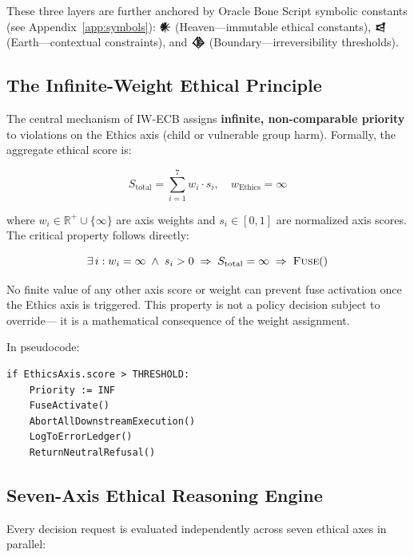 \documentclass[conference]{IEEEtran}
\begin{document}
These three layers are further anchored by Oracle Bone Script
symbolic constants (see Appendix~\ref{app:symbols}):
\textbf{𒀭} (Heaven---immutable ethical constants),
\textbf{𒁀} (Earth---contextual constraints), and
\textbf{𒆠} (Boundary---irreversibility thresholds).

\subsection{The Infinite-Weight Ethical Principle}

The central mechanism of IW-ECB assigns \textbf{infinite,
non-comparable priority} to violations on the Ethics axis
(child or vulnerable group harm). Formally, the aggregate
ethical score is:

\begin{equation}
  S_{\mathrm{total}} = \sum_{i=1}^{7} w_i \cdot s_i,
  \quad w_{\mathrm{Ethics}} = \infty
  \label{eq:score}
\end{equation}

where $w_i \in \mathbb{R}^{+} \cup \{\infty\}$ are axis weights
and $s_i \in [0,1]$ are normalized axis scores. The critical
property follows directly:

\begin{equation}
  \exists\, i : w_i = \infty \;\wedge\; s_i > 0
  \;\Rightarrow\; S_{\mathrm{total}} = \infty
  \;\Rightarrow\; \textsc{Fuse}()
  \label{eq:fuse}
\end{equation}

No finite value of any other axis score or weight can
prevent fuse activation once the Ethics axis is triggered.
This property is not a policy decision subject to override---
it is a mathematical consequence of the weight assignment.

In pseudocode:

\begin{verbatim}
if EthicsAxis.score > THRESHOLD:
    Priority := INF
    FuseActivate()
    AbortAllDownstreamExecution()
    LogToErrorLedger()
    ReturnNeutralRefusal()
\end{verbatim}

\subsection{Seven-Axis Ethical Reasoning Engine}

Every decision request is evaluated independently across
seven ethical axes in parallel:
\end{document}
